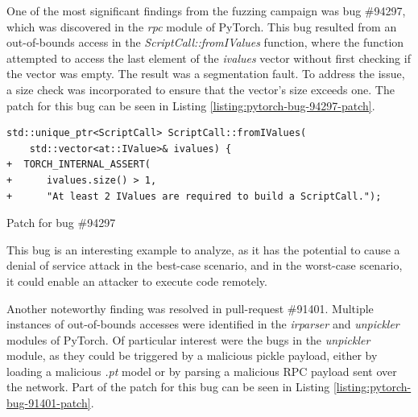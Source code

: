 One of the most significant findings from the fuzzing campaign was bug \#94297, which was discovered in the \textit{rpc} module of PyTorch. This bug resulted from an out-of-bounds access in the \textit{ScriptCall::fromIValues} function, where the function attempted to access the last element of the \textit{ivalues} vector without first checking if the vector was empty. The result was a segmentation fault. To address the issue, a size check was incorporated to ensure that the vector's size exceeds one. The patch for this bug can be seen in Listing \ref{listing:pytorch-bug-94297-patch}.

\begin{listing}[h!]
    \centering
    \begin{minipage}{\linewidth}
        \begin{verbatim}
std::unique_ptr<ScriptCall> ScriptCall::fromIValues(
    std::vector<at::IValue>& ivalues) {
+  TORCH_INTERNAL_ASSERT(
+      ivalues.size() > 1,
+      "At least 2 IValues are required to build a ScriptCall.");
    \end{verbatim}
    \end{minipage}
    \caption{Patch for bug \#94297}
    \label{listing:pytorch-bug-94297-patch}
\end{listing}

This bug is an interesting example to analyze, as it has the potential to cause a denial of service attack in the best-case scenario, and in the worst-case scenario, it could enable an attacker to execute code remotely.


Another noteworthy finding was resolved in pull-request \#91401. Multiple instances of out-of-bounds accesses were identified in the \textit{irparser} and \textit{unpickler} modules of PyTorch. Of particular interest were the bugs in the \textit{unpickler} module, as they could be triggered by a malicious pickle payload, either by loading a malicious \textit{.pt} model or by parsing a malicious RPC payload sent over the network. Part of the patch for this bug can be seen in Listing \ref{listing:pytorch-bug-91401-patch}.

